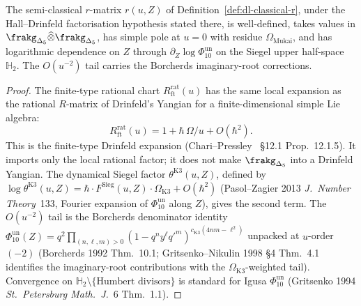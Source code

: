 \begin{theorem}
\label{thm:dl-C1-r-existence}
\ClaimStatusConditional
The semi-classical $r$-matrix $r(u, Z)$ of
Definition~\ref{def:dl-classical-r}, under the Hall--Drinfeld
factorisation hypothesis stated there, is well-defined, takes
values in $\frakg_{\Delta_5}\widehat\otimes\frakg_{\Delta_5}$, has
simple pole at $u = 0$ with residue $\Omega_{\mathrm{Mukai}}$, and
has logarithmic dependence on $Z$ through
$\partial_Z\log\Phi_{10}^{\mathrm{un}}$ on the Siegel upper half-space
$\mathbb H_2$. The $O(u^{-2})$ tail carries the Borcherds
imaginary-root corrections.
\end{theorem}

\begin{proof}
The finite-type rational chart $R^{\mathrm{rat}}_{\mathrm{ft}}(u)$
has the same local expansion as the rational $R$-matrix of
Drinfeld's Yangian for a finite-dimensional simple Lie algebra:
\[
R^{\mathrm{rat}}_{\mathrm{ft}}(u)
=1+\hbar\,\Omega/u+O(\hbar^2).
\]
This is the finite-type Drinfeld expansion
\cite[Thm.~1]{Drinfeld1985Yangians}
(Chari--Pressley~\cite{ChariPressley1994Guide} \S12.1 Prop.~12.1.5).
It imports only the local rational factor; it does not make
$\frakg_{\Delta_5}$ into a Drinfeld Yangian.
The dynamical Siegel factor $\theta^{\mathrm{K3}}(u, Z)$, defined by
$\log\theta^{\mathrm{K3}}(u, Z) = \hbar\cdot
F^{\mathrm{Sieg}}(u, Z)\cdot\Omega_{\mathrm{K3}} + O(\hbar^2)$
(Pasol--Zagier 2013 \emph{J.\ Number Theory}~133, Fourier expansion
of $\Phi_{10}^{\mathrm{un}}$ along $Z$), gives the second term. The $O(u^{-2})$
tail is the Borcherds denominator identity
$\Phi_{10}^{\mathrm{un}}(Z) = q^2\prod_{(n,\ell,m)>0}
(1 - q^n y^\ell q'^m)^{c_{\mathrm{K3}}(4nm-\ell^2)}$
unpacked at $u$-order $(-2)$
(Borcherds 1992 Thm.~10.1; Gritsenko--Nikulin 1998 \S4 Thm.~4.1
identifies the imaginary-root contributions with the
$\Omega_{\mathrm{K3}}$-weighted tail). Convergence on
$\mathbb H_2\setminus\{\text{Humbert divisors}\}$ is standard for
Igusa $\Phi_{10}^{\mathrm{un}}$ (Gritsenko 1994 \emph{St.\ Petersburg Math.\ J.}~6
Thm.~1.1).
\end{proof}

